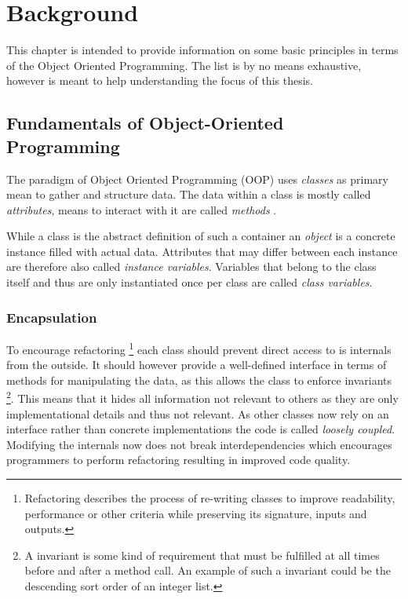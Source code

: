 \chapter{Background}

This chapter is intended to provide information on some basic principles in terms of the Object Oriented Programming. The list is by no means exhaustive, however is meant to help understanding the focus of this thesis.

\section{Fundamentals of Object-Oriented Programming}

The paradigm of Object Oriented Programming (OOP) uses \emph{classes} as primary mean to gather and structure data. The data within a class is mostly called \emph{attributes}, means to interact with it are called \emph{methods} \cite[80]{Castagna97}. 

While a class is the abstract definition of such a container an \emph{object} is a concrete instance filled with actual data. Attributes that may differ between each instance are therefore also called \emph{instance variables}. Variables that belong to the class itself and thus are only instantiated once per class are called \emph{class variables}. 

\subsection{Encapsulation} 
To encourage refactoring \footnote{Refactoring describes the process of re-writing classes to improve readability, performance or other criteria while preserving its signature, inputs and outputs.} each class should prevent direct access to is internals from the outside. It should however provide a well-defined interface in terms of methods for manipulating the data, as this allows the class to enforce invariants \footnote{A invariant is some kind of requirement that must be fulfilled at all times before and after a method call. An example of such a invariant could be the descending sort order of an integer list.}. This means that it hides all information not relevant to others as they are only implementational details and thus not relevant. As other classes now rely on an interface rather than concrete implementations the code is called \emph{loosely coupled}. Modifying the internals now does not break interdependencies which encourages programmers to perform refactoring resulting in improved code quality. 

